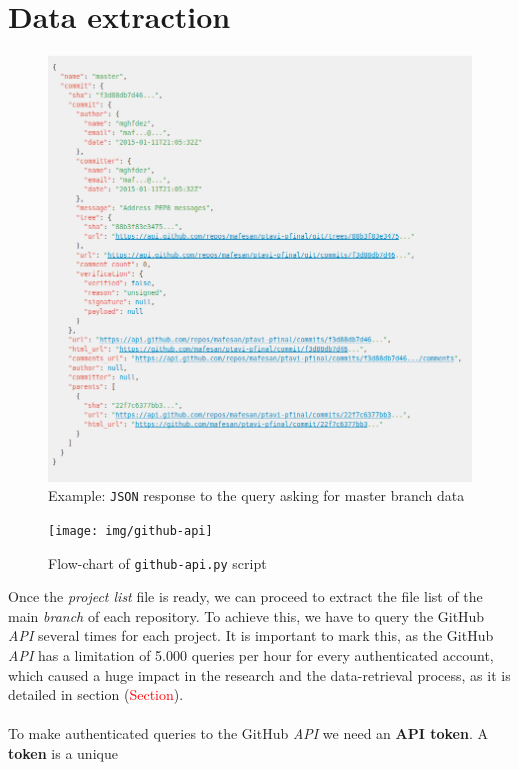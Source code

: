 \documentclass[a4paper, 12pt]{book}
\begin{document}
\section{Data extraction}
\label{sec:data-extraction}
\begin{figure}
  \centering
  \includegraphics[width=13cm, keepaspectratio]{img/gh-api-master-json-example}
  \caption{Example: \texttt{JSON} response to the query asking for master branch data}
  \label{fig:gh-api-master-json}
\end{figure}
\begin{figure}
  \centering
  \texttt{[image: img/github-api]}
  \caption{Flow-chart of \texttt{github-api.py} script}
  \label{fig:gh-api-diagram}
\end{figure}
Once the \emph{project list} file is ready, we can proceed to extract the file list of the main \textit{branch} of each
repository. To achieve this, we have to query the GitHub \textit{API} several times for each project.
It is important to mark this, as the GitHub \textit{API} has a limitation of 5.000 queries per hour for every authenticated
account, which caused a huge impact in the research and the data-retrieval process, as it is detailed in section (\textcolor{red}{Section}).\\\\
To make authenticated queries to the GitHub \textit{API} we need an \textbf{API token}. A \textbf{token} is a unique
\end{document}
